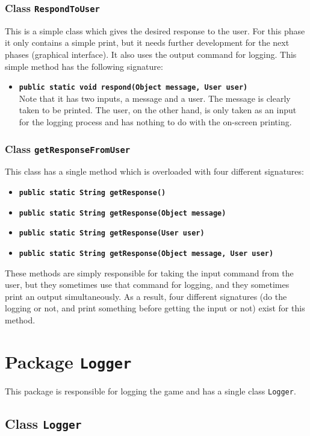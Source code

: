 \documentclass[a4paper]{article}
\begin{document}
\subsubsection{Class \texttt{RespondToUser}}
This is a simple class which gives the desired response to the user. For this phase it only contains a simple print, but it needs further development for the next phases (graphical interface). It also uses the output command for logging. This simple method has the following signature:
\begin{itemize}
	\item \texttt{\textbf{public static void respond(Object message, User user)}}\\
	Note that it has two inputs, a message and a user. The message is clearly taken to be printed. The user, on the other hand, is only taken as an input for the logging process and has nothing to do with the on-screen printing.
\end{itemize}

\subsubsection{Class \texttt{getResponseFromUser}}
This class has a single method which is overloaded with four different signatures:
\begin{itemize}
	\item \texttt{\textbf{public static String getResponse()}}
	\item \texttt{\textbf{public static String getResponse(Object message)}}
	\item \texttt{\textbf{public static String getResponse(User user)}}
	\item \texttt{\textbf{public static String getResponse(Object message, User user)}}
\end{itemize}
These methods are simply responsible for taking the input command from the user, but they sometimes use that command for logging, and they sometimes print an output simultaneously. As a result, four different signatures (do the logging or not, and print something before getting the input or not) exist for this method.\\

\clearpage
\section{Package \texttt{Logger}}
This package is responsible for logging the game and has a single class \texttt{Logger}.
\subsection{Class \texttt{Logger}}
\end{document}
